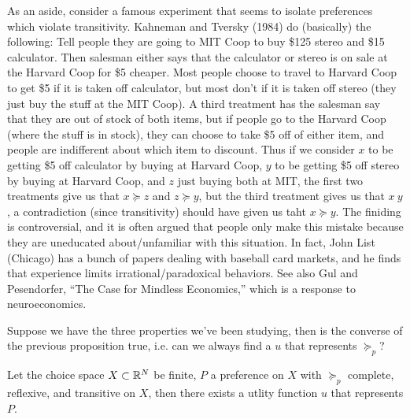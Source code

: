 As an aside, consider a famous experiment that seems to isolate
preferences which violate transitivity. Kahneman and Tversky (1984) do
(basically) the following: Tell people they are going to MIT Coop to
buy \$125 stereo and \$15 calculator. Then salesman either says that
the calculator or stereo is on sale at the Harvard Coop for \$5
cheaper. Most people choose to travel to Harvard Coop to get \$5 if it
is taken off calculator, but most don't if it is taken off stereo
(they just buy the stuff at the MIT Coop). A third treatment has the
salesman say that they are out of stock of both items, but if people
go to the Harvard Coop (where the stuff is in stock), they can choose
to take \$5 off of either item, and people are indifferent about which
item to discount. Thus if we consider $x$ to be getting \$5 off
calculator by buying at Harvard Coop, $y$ to be getting \$5 off stereo
by buying at Harvard Coop, and $z$ just buying both at MIT, the first
two treatments give us that $x \succeq z$ and $z \succeq y$, but the
third treatment gives us that $x ~ y$, a contradiction (since
transitivity) should have given us taht $x \succeq y$. The finiding is
controversial, and it is often argued that people only make this
mistake because they are uneducated about/unfamiliar with this
situation. In fact, John List (Chicago) has a bunch of papers dealing
with baseball card markets, and he finds that experience limits
irrational/paradoxical behaviors. See also Gul and Pesendorfer, ``The
Case for Mindless Economics,'' which is a response to neuroeconomics.


Suppose we have the three properties we've been studying, then is the
converse of the previous proposition true, i.e. can we always find a
$u$ that represents $\succeq_p$?

\begin{prop}
  Let the choice space $X \subset {\mathbb R}^N$ be finite, $P$ a preference on
  $X$ with $\succeq_p$ complete, reflexive, and transitive on $X$, then 
  there exists a utlity function $u$ that represents $P$.
\end{prop}

